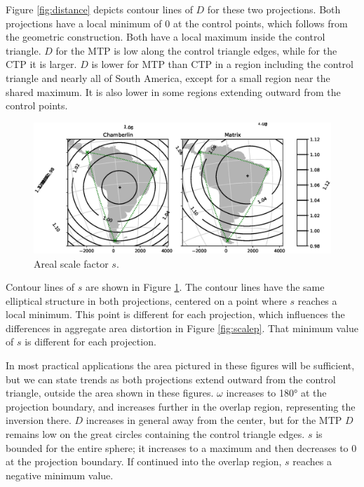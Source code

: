 \documentclass[]{interact}
\begin{document}
Figure \ref{fig:distance} depicts contour lines of $D$ for these two
projections. Both projections have a local minimum of 0 at the control points,
which follows from the geometric construction. Both have a local maximum inside
the control triangle. $D$ for the MTP is low along the control
triangle edges, while for the CTP it is larger. $D$ is
lower for MTP than CTP in a region including the control triangle and
nearly all of South America, except for a small region near the shared maximum.
It is also lower in some regions extending outward from the control points.

\begin{figure}
  \includegraphics[width=\textwidth]{South_America_Wall_Map_scale}
  \caption{Areal scale factor $s$.}
  \label{fig:scale}
\end{figure}

Contour lines of $s$ are shown in Figure \ref{fig:scale}.
The contour lines have the same elliptical structure in both projections,
centered on a point where $s$ reaches a local minimum.
This point is different for each projection, which influences
the differences in aggregate area distortion in Figure \ref{fig:scalep}.
That minimum value of $s$ is different for each projection.

In most practical applications the area pictured in these figures will be
sufficient, but we can state trends as both projections extend outward from the
control triangle, outside the area shown in these figures. $\omega$ increases to
180° at the projection boundary, and increases further in the overlap region,
representing the inversion there. $D$ increases in general away from the center,
but for the MTP $D$ remains low on the great circles
containing the control triangle edges. $s$ is bounded for the entire sphere; it
increases to a maximum and then decreases to 0 at the projection boundary. If
continued into the overlap region, $s$ reaches a negative minimum value.
\end{document}
